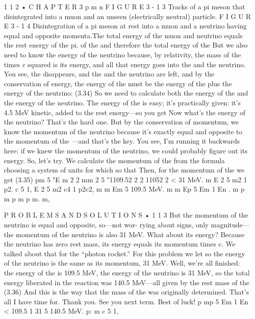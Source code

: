 \documentclass[10pt,oneside]{article}
\begin{document}
1 1 2 • C H A P T E R  3 p m n F I G U R E  3 - 1 3 Tracks of a pi meson that disintegrated into a muon and an unseen (electrically neutral) particle. F I G U R E  3 - 1 4 Disintegration of a pi meson at rest into a muon and a neutrino having equal and opposite momenta.The total energy of the muon and neutrino equals the rest energy of the pi. of the and therefore the total energy of the But we also need to know the energy of the neutrino because, by relativity, the mass of the times c squared is its energy, and all that energy goes into the and the neutrino. You see, the disappears, and the and the neutrino are left, and by the conservation of energy, the energy of the must be the energy of the plus the energy of the neutrino: (3.34) So we need to calculate both the energy of the and the energy of the neutrino. The energy of the is easy; it’s practically given: it’s 4.5 MeV kinetic, added to the rest energy---so you get Now what’s the energy of the neutrino? That’s the hard one. But by the conservation of momentum, we know the momentum of the neutrino because it’s exactly equal and opposite to the momentum of the ---and that’s the key. You see, I’m running it backwards here: if we knew the momentum of the neutrino, we could probably figure out its energy. So, let’s try. We calculate the momentum of the from the formula choosing a system of units for which so that Then, for the momentum of the we get (3.35) pm 5 "E m 2 2 mm 2 5 "1109.52 2 2 11052 2 < 31 MeV. m E 2 5 m2 1 p2. c 5 1, E 2 5 m2 c4 1 p2c2, m m Em 5 109.5 MeV. m m Ep 5 Em 1 En . m p m p m p m. m,\par

P R O B L E M S  A N D  S O L U T I O N S • 1 1 3 But the momentum of the neutrino is equal and opposite, so---not wor- rying about signs, only magnitude---the momentum of the neutrino is also 31 MeV. What about its energy? Because the neutrino has zero rest mass, its energy equals its momentum times c. We talked about that for the “photon rocket.” For this problem we let so the energy of the neutrino is the same as its momentum, 31 MeV. Well, we’re all finished: the energy of the is 109.5 MeV, the energy of the neutrino is 31 MeV, so the total energy liberated in the reaction was 140.5 MeV---all given by the rest mass of the (3.36) And this is the way that the mass of the was originally determined. That’s all I have time for. Thank you. See you next term. Best of luck! p mp 5 Em 1 En < 109.5 1 31 5 140.5 MeV. p: m c 5 1,\par

\clearpage
{}
\end{document}
